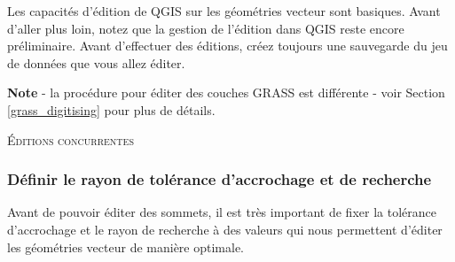 \begin{itemize}
Les capacités d'édition de QGIS sur les géométries vecteur sont basiques. Avant d'aller plus loin, notez que la gestion de l'édition dans QGIS reste encore préliminaire. Avant d'effectuer des éditions, créez toujours une sauvegarde du jeu de données que vous allez éditer.

\textbf{Note} - la procédure pour éditer des couches GRASS est différente - voir Section \ref{grass_digitising} pour plus de détails.


\begin{Astuce}[ht]\caption{\textsc{Éditions concurrentes}}
\end{Astuce}

\subsubsection{Définir le rayon de tolérance d'accrochage et de recherche}

Avant de pouvoir éditer des sommets, il est très important de fixer la tolérance d'accrochage et le rayon de recherche à des valeurs qui nous permettent d'éditer les géométries vecteur de manière optimale.



\end{itemize}
